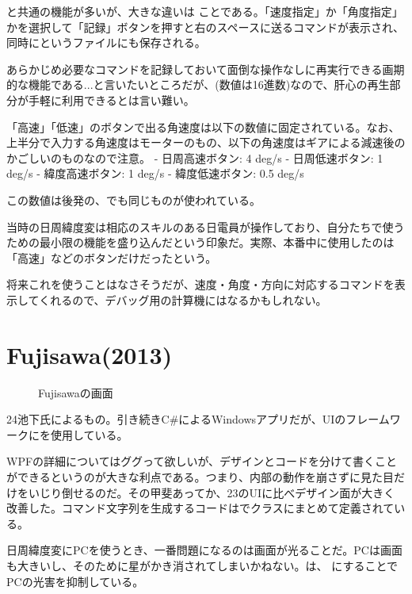 \documentclass[letterpaper,10pt,dvipdfmx]{sphinxmanual}
\begin{document}
と共通の機能が多いが、大きな違いは
ことである。「速度指定」か「角度指定」かを選択して「記録」ボタンを押すと右のスペースに送るコマンドが表示され、同時にというファイルにも保存される。

あらかじめ必要なコマンドを記録しておいて面倒な操作なしに再実行できる画期的な機能である...と言いたいところだが、(数値は16進数)なので、肝心の再生部分が手軽に利用できるとは言い難い。

「高速」「低速」のボタンで出る角速度は以下の数値に固定されている。なお、上半分で入力する角速度はモーターのもの、以下の角速度はギアによる減速後のかごしいのものなので注意。
- 日周高速ボタン: 4 deg/s - 日周低速ボタン: 1 deg/s - 緯度高速ボタン: 1
deg/s - 緯度低速ボタン: 0.5 deg/s

この数値は後発の、でも同じものが使われている。

当時の日周緯度変は相応のスキルのある日電員が操作しており、自分たちで使うための最小限の機能を盛り込んだという印象だ。実際、本番中に使用したのは「高速」などのボタンだけだったという。

将来これを使うことはなさそうだが、速度・角度・方向に対応するコマンドを表示してくれるので、デバッグ用の計算機にはなるかもしれない。


\section{Fujisawa(2013)}
\label{\detokenize{nissyu-idohen/pc-software-history:fujisawa-2013}}\begin{figure}[htbp]
\centering
\capstart

\noindent{}
\caption{Fujisawaの画面}\label{\detokenize{nissyu-idohen/pc-software-history:id5}}\end{figure}

24池下氏によるもの。引き続きC\#によるWindowsアプリだが、UIのフレームワークにを使用している。

WPFの詳細についてはググって欲しいが、デザインとコードを分けて書くことができるというのが大きな利点である。つまり、内部の動作を崩さずに見た目だけをいじり倒せるのだ。その甲斐あってか、23のUIに比べデザイン面が大きく改善した。コマンド文字列を生成するコードはでクラスにまとめて定義されている。

日周緯度変にPCを使うとき、一番問題になるのは画面が光ることだ。PCは画面も大きいし、そのために星がかき消されてしまいかねない。は、
にすることでPCの光害を抑制している。
\end{document}
